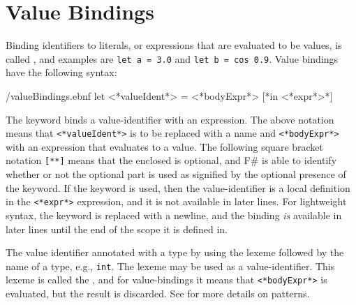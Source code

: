 \documentclass[fsharpnotes.tex]{subfiles}
\begin{document}
\section{Value Bindings}
\label{sec:values}
Binding identifiers to literals, or expressions that are evaluated to be values, is called , and examples are \lstinline!let a = 3.0! and \lstinline!let b = cos 0.9!. Value bindings have the following syntax:
%
\begin{verbatimwrite}{\ebnf/valueBindings.ebnf}
let <*valueIdent*> = <*bodyExpr*> [*in <*expr*>*]
\end{verbatimwrite}
%
The  keyword binds a value-identifier with an expression. The above notation means that \lstinline[language=syntax]{<*valueIdent*>} is to be replaced with a name and \lstinline[language=syntax]{<*bodyExpr*>} with an expression that evaluates to a value. The following square bracket notation \lstinline[language=syntax]{[**]} means that the enclosed is optional, and F\# is able to identify whether or not the optional part is used as signified by the optional presence of the  keyword. If the  keyword is used, then the value-identifier is a local definition in the \lstinline[language=syntax]{<*expr*>} expression, and it is not available in later lines. For lightweight syntax, the  keyword is replaced with a newline, and the binding \emph{is} available in later lines until the end of the scope it is defined in.

The value identifier annotated with a type by using the \idx[:@\lstinline{:}]{\lexeme{:}} lexeme followed by the name of a type, e.g., \lstinline{int}. The \idx[\_@\lstinline{_}]{\lexeme{\_}} lexeme may be used as a value-identifier. This lexeme is called the , and for value-bindings it means that \lstinline[language=syntax]{<*bodyExpr*>} is evaluated, but the result is discarded. See  for more details on patterns.
\end{document}
